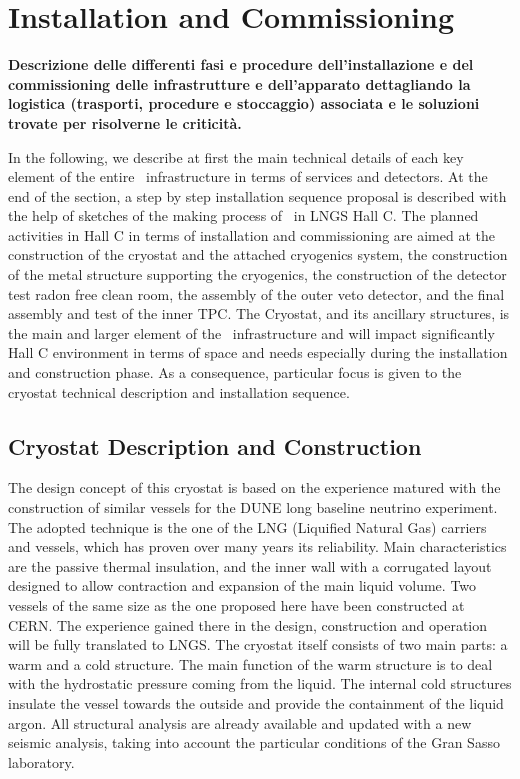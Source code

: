 \section{Installation and Commissioning}
\label{sec:InstallationAndCommissioning}

{\bf\color{red}
Descrizione delle differenti fasi e procedure dell’installazione e del commissioning
delle infrastrutture e dell’apparato dettagliando la logistica (trasporti, procedure e
stoccaggio) associata e le soluzioni trovate per risolverne le criticità.}

In the following, we describe at first the main technical details of each key element of the
entire \DSks\ infrastructure in terms of services and detectors. At the end of the
section, a step by step installation sequence proposal is described with the help of sketches of
the making process of \DSks\ in LNGS Hall C.
The planned activities in Hall C in terms of installation and commissioning are aimed at the
construction of the cryostat and the attached cryogenics system, the construction of the metal
structure supporting the cryogenics, the construction of the detector test radon free clean
room, the assembly of the outer veto detector, and the final assembly and test of the inner
TPC.
The Cryostat, and its ancillary structures, is the main and larger element of the \DSks\
infrastructure and will impact significantly Hall C environment in terms of space and needs
especially during the installation and construction phase. As a consequence, particular focus is
given to the cryostat technical description and installation sequence.

\subsection{Cryostat Description and Construction}
\label{sec:CryostatConstruction}

The design concept of this cryostat is based on the experience matured with the construction
of similar vessels for the DUNE long baseline neutrino experiment. The adopted technique is
the one of the LNG (Liquified Natural Gas) carriers and vessels, which has proven over many
years its reliability. Main characteristics are the passive thermal insulation, and the inner wall
with a corrugated layout designed to allow contraction and expansion of the main liquid
volume.
Two vessels of the same size as the one proposed here have been constructed at CERN. The
experience gained there in the design, construction and operation will be fully translated to
LNGS.
The cryostat itself consists of two main parts: a warm and a cold structure. The main function
of the warm structure is to deal with the hydrostatic pressure coming from the liquid. The
internal cold structures insulate the vessel towards the outside and provide the containment of
the liquid argon. All structural analysis are already available and updated with a new seismic
analysis, taking into account the particular conditions of the Gran Sasso laboratory.

